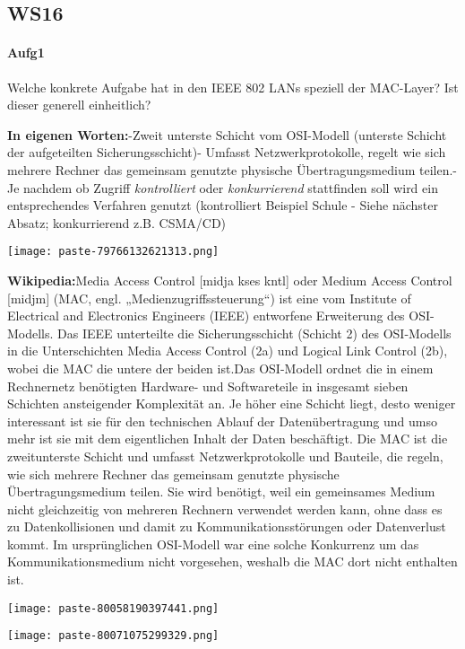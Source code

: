 \documentclass{article}
\begin{document}
\subsection{WS16}
\paragraph{Aufg1}
\begin{tcolorbox}[colback=white!10!white,colframe=lightgray!75!black,
  savelowerto=\jobname_ex.tex,breakable,enhanced,lines before break=40]

\justifying
Welche konkrete Aufgabe hat in den IEEE 802 LANs speziell der MAC-Layer? Ist dieser generell einheitlich?

\tcblower

\justifying
\textbf{In eigenen Worten:}-Zweit unterste Schicht vom OSI-Modell (unterste Schicht der aufgeteilten Sicherungsschicht)- Umfasst Netzwerkprotokolle, regelt wie sich mehrere Rechner das gemeinsam genutzte physische Übertragungsmedium teilen.- Je nachdem ob Zugriff \textit{kontrolliert }oder \textit{konkurrierend} stattfinden soll wird ein entsprechendes Verfahren genutzt (kontrolliert  Beispiel Schule - Siehe nächster Absatz; konkurrierend  z.B. CSMA/CD)\begin{center}
\texttt{[image: paste-79766132621313.png]}
\end{center}
\textbf{Wikipedia:}Media Access Control [midja kses kntl] oder Medium Access Control [midjm] (MAC, engl. „Medienzugriffssteuerung“) ist eine vom Institute of Electrical and Electronics Engineers (IEEE) entworfene Erweiterung des OSI-Modells. Das IEEE unterteilte die Sicherungsschicht (Schicht 2) des OSI-Modells in die Unterschichten Media Access Control (2a) und Logical Link Control (2b), wobei die MAC die untere der beiden ist.Das OSI-Modell ordnet die in einem Rechnernetz benötigten Hardware- und Softwareteile in insgesamt sieben Schichten ansteigender Komplexität an. Je höher eine Schicht liegt, desto weniger interessant ist sie für den technischen Ablauf der Datenübertragung und umso mehr ist sie mit dem eigentlichen Inhalt der Daten beschäftigt. Die MAC ist die zweitunterste Schicht und umfasst Netzwerkprotokolle und Bauteile, die regeln, wie sich mehrere Rechner das gemeinsam genutzte physische Übertragungsmedium teilen. Sie wird benötigt, weil ein gemeinsames Medium nicht gleichzeitig von mehreren Rechnern verwendet werden kann, ohne dass es zu Datenkollisionen und damit zu Kommunikationsstörungen oder Datenverlust kommt. Im ursprünglichen OSI-Modell war eine solche Konkurrenz um das Kommunikationsmedium nicht vorgesehen, weshalb die MAC dort nicht enthalten ist.\begin{center}
\texttt{[image: paste-80058190397441.png]}
\end{center}
\begin{center}
\texttt{[image: paste-80071075299329.png]}
\end{center}

\end{tcolorbox}
\end{document}
